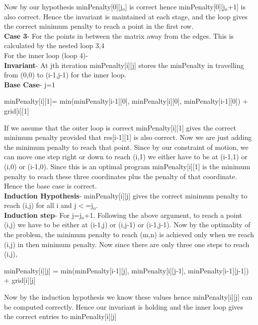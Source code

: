 \documentclass{article}
\begin{document}
Now by our hypothesis minPenalty[0][j$_o$] is correct hence minPenalty[0][j$_o$+1] is also correct. Hence the  invariant is maintained at each stage, and the loop gives the correct minimum penalty to reach a point in the first row.\\

\textbf{Case 3}- For the points in between the matrix away from the edges. This is calculated by the nested loop 3,4\\

For the inner loop (loop 4)-\\
\textbf{Invariant}- At jth iteration minPenalty[i][j] stores the minPenalty in travelling from (0,0) to (i-1,j-1) for the inner loop.\\
\textbf{Base Case}- j=1
\begin{center}minPenalty[i][1]= min(minPenalty[i-1][0], minPenalty[i][0], minPenalty[i-1][0]) + grid[i][1]\end{center} 
If we assume that the outer loop is correct minPenalty[i][1] gives the correct minimum penalty provided that res[i-1][1] is also correct. Now we are just adding the minimum penalty to reach that point. Since by our constraint of motion, we can move one step right or down to reach (i,1) we either have to be at (i-1,1) or (i,0) or (i-1,0). Since this is an optimal program minPenalty[i][1] is the minimum penalty to reach these three coordinates plus the penalty of that coordinate. Hence the base case is correct. \\
\textbf{Induction Hypothesis}- minPenalty[i][j] gives the correct minimum penalty to reach (i,j) for all i and j$<$=j$_o$.\\
\textbf{Induction step}- For j=j$_o$+1. Following the above argument, to reach a point (i,j) we have to be either at (i-1,j) or (i,j-1) or (i-1,j-1). Now by the optimality of the problem, the minimum penalty to reach (m,n) is achieved only when we reach (i,j) in then minimum penalty. Now since there are only three one steps to reach (i,j), 
\begin{center}minPenalty[i][j] = min(minPenalty[i-1][j], minPenalty[i][j-1], minPenalty[i-1][j-1]) + grid[i][j]\end{center} Now by the induction hypothesis we know these values hence minPenalty[i][j] can be computed correctly. Hence our invariant is holding and the inner loop gives the correct entries to minPenalty[i][j] \\
\end{document}
